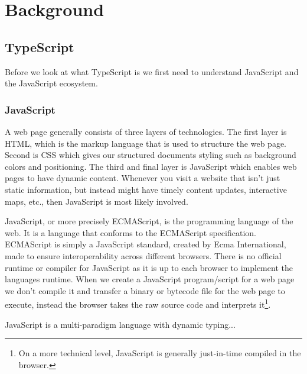 
\chapter{Background}\label{ch:background}



\section{TypeScript}\label{sec:typescript}

Before we look at what TypeScript is we first need to understand JavaScript and the JavaScript ecosystem.

\subsection{JavaScript}\label{subsec:javascript}


A web page generally consists of three layers of technologies.
The first layer is HTML, which is the markup language that is used to structure the web page.
Second is CSS which gives our structured documents styling such as background colors and positioning.
The third and final layer is JavaScript which enables web pages to have dynamic content.
Whenever you visit a website that isn't just static information, but instead might have timely content updates, interactive maps, etc., then JavaScript is most likely involved\cite{whatisjs}.

JavaScript, or more precisely ECMAScript, is the programming language of the web.
It is a language that conforms to the ECMAScript specification.
ECMAScript is simply a JavaScript standard, created by Ecma International, made to ensure interoperability across different browsers.
There is no official runtime or compiler for JavaScript as it is up to each browser to implement the languages runtime.
When we create a JavaScript program/script for a web page we don't compile it and transfer a binary or bytecode file for the web page to execute, instead the browser takes the raw source code and interprets it\footnote{On a more technical level, JavaScript is generally just-in-time compiled in the browser.}.

JavaScript is a multi-paradigm language with dynamic typing...

